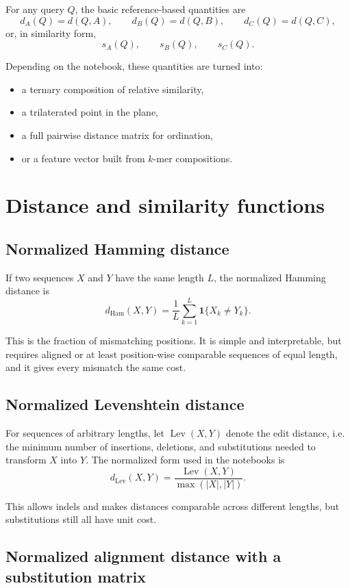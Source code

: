 \documentclass[11pt,a4paper]{article}
\begin{document}
For any query $Q$, the basic reference-based quantities are
\[
d_A(Q)=d(Q,A),\qquad d_B(Q)=d(Q,B),\qquad d_C(Q)=d(Q,C),
\]
or, in similarity form,
\[
s_A(Q),\qquad s_B(Q),\qquad s_C(Q).
\]

Depending on the notebook, these quantities are turned into:

\begin{itemize}[leftmargin=*]
\item a ternary composition of relative similarity,
\item a trilaterated point in the plane,
\item a full pairwise distance matrix for ordination,
\item or a feature vector built from $k$-mer compositions.
\end{itemize}

\section{Distance and similarity functions}

\subsection{Normalized Hamming distance}

If two sequences $X$ and $Y$ have the same length $L$, the normalized Hamming distance is
\[
d_{\mathrm{Ham}}(X,Y)=\frac{1}{L}\sum_{k=1}^{L}\mathbf{1}\{X_k\neq Y_k\}.
\]

This is the fraction of mismatching positions. It is simple and interpretable, but requires aligned or at least position-wise comparable sequences of equal length, and it gives every mismatch the same cost.

\subsection{Normalized Levenshtein distance}

For sequences of arbitrary lengths, let $\operatorname{Lev}(X,Y)$ denote the edit distance, i.e. the minimum number of insertions, deletions, and substitutions needed to transform $X$ into $Y$. The normalized form used in the notebooks is
\[
d_{\mathrm{Lev}}(X,Y)=\frac{\operatorname{Lev}(X,Y)}{\max(|X|,|Y|)}.
\]

This allows indels and makes distances comparable across different lengths, but substitutions still all have unit cost.

\subsection{Normalized alignment distance with a substitution matrix}
\end{document}
